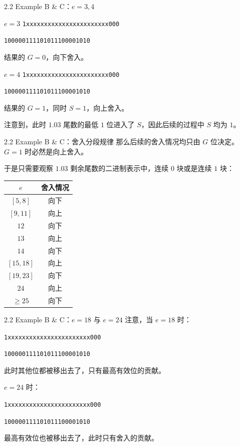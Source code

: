 \documentclass{beamer}
\begin{document}
\begin{frame}{2.2 Example B \& C：$e=3,4$}
\begin{block}{$e=3$}
\texttt{1xxxxxxxxxxxxxxxxxxxxxxx000}

\texttt{\hspace*{1.8em}100000111101011100001010}

结果的 $G=0$，向下舍入。
\end{block}
\pause
\begin{block}{$e=4$}
\texttt{1xxxxxxxxxxxxxxxxxxxxxxx000}

\texttt{\hspace*{2.4em}100000111101011100001010}

结果的 $G=1$，同时 $S=1$，向上舍入。
\end{block}
\pause
注意到，此时 $1.03$ 尾数的最低 $1$ 位进入了 $S$，因此后续的过程中 $S$ 均为 $1$。
\end{frame}

\begin{frame}{2.2 Example B \& C：舍入分段规律}
那么后续的舍入情况均只由 $G$ 位决定。$G=1$ 时必然是向上舍入。
\pause

于是只需要观察 $1.03$ 剩余尾数的二进制表示中，连续 $0$ 块或是连续 $1$ 块：

\begin{center}
\begin{tabular}{cc}
\toprule
$e$ & 舍入情况 \\
\midrule
$[5, 8]$   & 向下 \\
$[9, 11]$  & 向上 \\
$12$       & 向下 \\
$13$       & 向上 \\
$14$       & 向下 \\
$[15, 18]$ & 向上 \\
$[19,23]$  & 向下 \\
$24$       & 向上 \\
$\ge 25$   & 向下 \\
\bottomrule
\end{tabular}
\end{center}
\end{frame}

\begin{frame}{2.2 Example B \& C：$e=18$ 与 $e=24$}
注意，当 $e=18$ 时：

\texttt{1xxxxxxxxxxxxxxxxxxxxxxx000}

\texttt{\phantom{xxxxxxxxxxxxxxxxxx}100000111101011100001010}

此时其他位都被移出去了，只有最高有效位的贡献。
\pause

\vspace{0.5em}

$e=24$ 时：

\texttt{1xxxxxxxxxxxxxxxxxxxxxxx000}

\texttt{\phantom{xxxxxxxxxxxxxxxxxxxxxxxx}100000111101011100001010}

最高有效位也被移出去了，此时只有舍入的贡献。
\end{frame}
\end{document}
